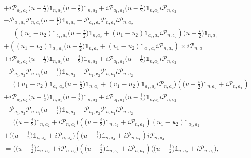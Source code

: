 \documentclass{homework}
\begin{document}
\begin{align*}
    &+ i \bm{\mathcal{P}}_{a_1, a_2} \bigg(u-\frac{i}{2}\bigg) \mathds{1}_{n, a_1}  \bigg(u-\frac{i}{2}\bigg) \mathds{1}_{n, a_2} + i \bm{\mathcal{P}}_{a_1, a_2} \bigg(u-\frac{i}{2}\bigg) \mathds{1}_{n, a_1} i \bm{\mathcal{P}}_{n, a_2} \\
    & - \bm{\mathcal{P}}_{a_1, a_2}  \bm{\mathcal{P}}_{n, a_1}  \bigg(u-\frac{i}{2}\bigg) \mathds{1}_{n, a_2} - \bm{\mathcal{P}}_{a_1, a_2}  \bm{\mathcal{P}}_{n, a_1} i \bm{\mathcal{P}}_{n, a_2} \\
    &= \left({(u_1-u_2) \mathds{1}_{a_1, a_2}  \bigg(u-\frac{i}{2}\bigg) \mathds{1}_{n, a_2}} + {(u_1-u_2) \mathds{1}_{a_1, a_2} i \bm{\mathcal{P}}_{n, a_2}}\right) \bigg(u-\frac{i}{2}\bigg) \mathds{1}_{n, a_1} \\ 
    &+ \left({(u_1-u_2) \mathds{1}_{a_1, a_2} \bigg(u-\frac{i}{2}\bigg) \mathds{1}_{n, a_2}} + {(u_1-u_2) \mathds{1}_{a_1, a_2} i \bm{\mathcal{P}}_{n, a_2}} \right) \times  i \bm{\mathcal{P}}_{n, a_1} \\
    &+ i \bm{\mathcal{P}}_{a_1, a_2} \bigg(u-\frac{i}{2}\bigg) \mathds{1}_{n, a_1} \bigg(u-\frac{i}{2}\bigg) \mathds{1}_{n, a_2} + i \bm{\mathcal{P}}_{a_1, a_2} \bigg(u-\frac{i}{2}\bigg) \mathds{1}_{n, a_1} i \bm{\mathcal{P}}_{n, a_2} \\
    & - \bm{\mathcal{P}}_{a_1, a_2}  \bm{\mathcal{P}}_{n, a_1}  \bigg(u-\frac{i}{2}\bigg) \mathds{1}_{n, a_2} - \bm{\mathcal{P}}_{a_1, a_2}  \bm{\mathcal{P}}_{n, a_1} i \bm{\mathcal{P}}_{n, a_2} \\
    &= \bigg((u_1-u_2) \mathds{1}_{a_1, a_2} \bigg(u-\frac{i}{2}\bigg) \mathds{1}_{n, a_2} + {(u_1-u_2) \mathds{1}_{a_1, a_2} i \bm{\mathcal{P}}_{n, a_2}} \bigg) \left( \bigg(u-\frac{i}{2}\bigg) \mathds{1}_{n, a_2} + i \bm{\mathcal{P}}_{n, a_1} \right) \\
    &+ i \bm{\mathcal{P}}_{a_1, a_2} \bigg(u-\frac{i}{2}\bigg) \mathds{1}_{n, a_1} \bigg(u-\frac{i}{2}\bigg) \mathds{1}_{n, a_2} + i \bm{\mathcal{P}}_{a_1, a_2} \bigg(u-\frac{i}{2}\bigg) \mathds{1}_{n, a_1} i \bm{\mathcal{P}}_{n, a_2} \\
    & - \bm{\mathcal{P}}_{a_1, a_2}  \bm{\mathcal{P}}_{n, a_1}  \bigg(u-\frac{i}{2}\bigg) \mathds{1}_{n, a_2} - \bm{\mathcal{P}}_{a_1, a_2}  \bm{\mathcal{P}}_{n, a_1} i \bm{\mathcal{P}}_{n, a_2} \\
    &= \bigg( \bigg(u-\frac{i}{2}\bigg) \mathds{1}_{n, a_2}  + { i \bm{\mathcal{P}}_{n, a_2}} \bigg) \left( \bigg(u-\frac{i}{2}\bigg) \mathds{1}_{n, a_2} + i \bm{\mathcal{P}}_{n, a_1} \right) (u_1-u_2) \mathds{1}_{a_1, a_2}  \\
    &+ \bigg( \bigg(u-\frac{i}{2}\bigg) \mathds{1}_{n, a_2}  + { i \bm{\mathcal{P}}_{n, a_2}} \bigg) \left( \bigg(u-\frac{i}{2}\bigg) \mathds{1}_{n, a_2} + i \bm{\mathcal{P}}_{n, a_1} \right)  i \bm{\mathcal{P}}_{n, a_2}  \\
    &= \bigg( \bigg(u-\frac{i}{2}\bigg) \mathds{1}_{n, a_2}  + { i \bm{\mathcal{P}}_{n, a_2}} \bigg) \left( \bigg(u-\frac{i}{2}\bigg) \mathds{1}_{n, a_2} + i \bm{\mathcal{P}}_{n, a_1} \right) \bigg(\bigg(u-\frac{i}{2}\bigg) \mathds{1}_{n, a_2} + i \bm{\mathcal{P}}_{n, a_2} \bigg), 
\end{align*}
\end{document}
